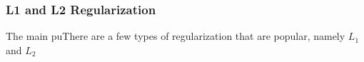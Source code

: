 \subsubsection{L1 and L2 Regularization}

The main puThere are a few types of regularization that are popular, namely $L_1$ and $L_2$